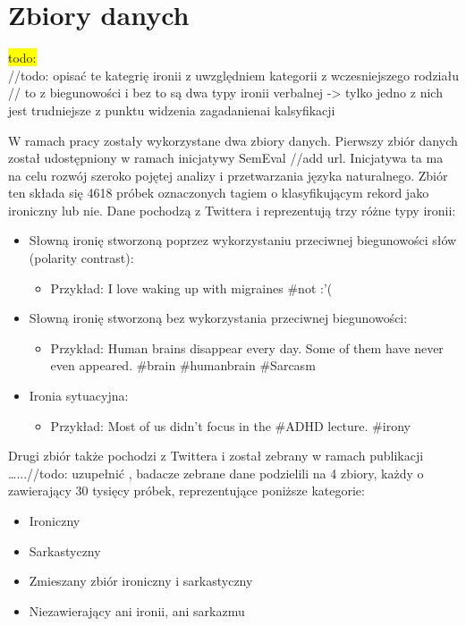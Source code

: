\newpage %
\section{Zbiory danych} \label{dane_wejsciowe}

\colorbox{yellow}{todo:}\\

//todo: opisać te kategrię ironii z uwzględniem kategorii z wczesniejszego rodziału
// to z biegunowości i bez to są dwa typy ironii verbalnej -> tylko jedno z nich jest trudniejsze z punktu widzenia zagadanienai kalsyfikacji

W ramach pracy zostały wykorzystane dwa zbiory danych. Pierwszy zbiór danych został udostępniony w ramach inicjatywy SemEval //add url. Inicjatywa ta ma na celu rozwój szeroko pojętej analizy i przetwarzania języka naturalnego. Zbiór ten składa się 4618 próbek oznaczonych tagiem o klasyfikującym rekord jako ironiczny lub nie. Dane pochodzą z Twittera i reprezentują trzy różne typy ironii:
\begin{itemize}
    \item Słowną ironię stworzoną poprzez wykorzystaniu przeciwnej biegunowości słów (polarity contrast):
          \begin{itemize}
              \item Przykład: I love waking up with migraines \#not :'(
          \end{itemize}

    \item Słowną ironię stworzoną bez wykorzystania przeciwnej biegunowości:
          \begin{itemize}
              \item Przykład: Human brains disappear every day. Some of them have never even appeared. \#brain \#humanbrain \#Sarcasm
          \end{itemize}

    \item Ironia sytuacyjna:
          \begin{itemize}
              \item Przykład: Most of us didn't focus in the \#ADHD lecture. \#irony
          \end{itemize}
\end{itemize}



Drugi zbiór także pochodzi z Twittera i został zebrany w ramach publikacji …...//todo: uzupełnić  , badacze zebrane dane podzielili na 4 zbiory, każdy o zawierający 30 tysięcy próbek,  reprezentujące poniższe kategorie:
\begin{itemize}
    \item Ironiczny
    \item Sarkastyczny
    \item Zmieszany zbiór ironiczny i sarkastyczny
    \item Niezawierający ani ironii, ani sarkazmu

\end{itemize}

